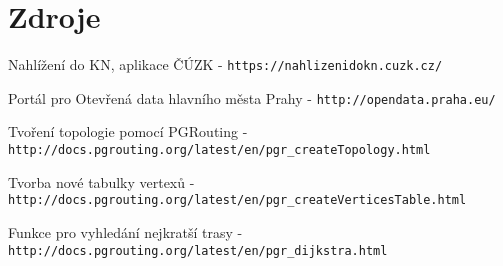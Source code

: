 \documentclass[a4paper, 12pt]{article}
\begin{document}
\section{Zdroje}
\noindent
[1] Nahlížení do KN, aplikace ČÚZK - \texttt{https://nahlizenidokn.cuzk.cz/} 

\noindent
[2] Portál pro Otevřená data hlavního města Prahy - \texttt{http://opendata.praha.eu/}

\noindent
[3] Tvoření topologie pomocí PGRouting - \texttt{http://docs.pgrouting.org/latest/en/pgr\_createTopology.html}

\noindent
[4] Tvorba nové tabulky vertexů - \texttt{http://docs.pgrouting.org/latest/en/pgr\_createVerticesTable.html}

\noindent 
[5] Funkce pro vyhledání nejkratší trasy - \texttt{http://docs.pgrouting.org/latest/en/pgr\_dijkstra.html}
 
\end{document}
